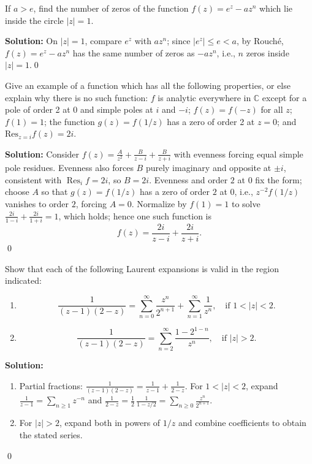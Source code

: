\begin{problembox}
If \( a > e \), find the number of zeros of the function \( f(z) = e^z - a z^n \) which lie inside the circle \( |z| = 1 \).
\end{problembox}

\noindent\textbf{Solution:}
On $|z|=1$, compare $e^z$ with $a z^n$; since $|e^z|\le e< a$, by Rouché, $f(z)=e^z-az^n$ has the same number of zeros as $-az^n$, i.e., $n$ zeros inside $|z|=1$.\qed


\begin{problembox}
Give an example of a function which has all the following properties, or else explain why there is no such function: \( f \) is analytic everywhere in \( \mathbb{C} \) except for a pole of order 2 at 0 and simple poles at \( i \) and \( -i \); \( f(z) = f(-z) \) for all \( z \); \( f(1) = 1 \); the function \( g(z) = f(1/z) \) has a zero of order 2 at \( z = 0 \); and \( \text{Res}_{z=i} f(z) = 2i \).
\end{problembox}

\noindent\textbf{Solution:}
Consider $f(z)=\frac{A}{z^2}+\frac{B}{z-i}+\frac{B}{z+i}$ with evenness forcing equal simple pole residues. Evenness also forces $B$ purely imaginary and opposite at $\pm i$, consistent with $\operatorname{Res}_{i}f=2i$, so $B=2i$. Evenness and order $2$ at $0$ fix the form; choose $A$ so that $g(z)=f(1/z)$ has a zero of order $2$ at $0$, i.e., $z^{-2}f(1/z)$ vanishes to order $2$, forcing $A=0$. Normalize by $f(1)=1$ to solve $\frac{2i}{1-i}+\frac{2i}{1+i}=1$, which holds; hence one such function is
\[f(z)=\frac{2i}{z-i}+\frac{2i}{z+i}.
\]\qed


\begin{problembox}
Show that each of the following Laurent expansions is valid in the region indicated:
\begin{enumerate}[label=(\alph*)]
\item \[ \frac{1}{(z - 1)(2 - z)} = \sum_{n=0}^{\infty} \frac{z^n}{2^{n+1}} + \sum_{n=1}^{\infty} \frac{1}{z^n}, \quad \text{if } 1 < |z| < 2. \]
\item \[ \frac{1}{(z - 1)(2 - z)} = \sum_{n=2}^{\infty} \frac{1 - 2^{1-n}}{z^n}, \quad \text{if } |z| > 2. \]
\end{enumerate}
\end{problembox}

\noindent\textbf{Solution:}
\begin{enumerate}[label=(\alph*)]
\item Partial fractions: $\frac{1}{(z-1)(2-z)}=\frac{1}{z-1}+\frac{1}{2-z}$. For $1<|z|<2$, expand $\frac{1}{z-1}=\sum_{n\ge1}z^{-n}$ and $\frac{1}{2-z}=\frac{1}{2}\,\frac{1}{1-z/2}=\sum_{n\ge0}\frac{z^n}{2^{n+1}}$.
\item For $|z|>2$, expand both in powers of $1/z$ and combine coefficients to obtain the stated series.
\end{enumerate}\qed


